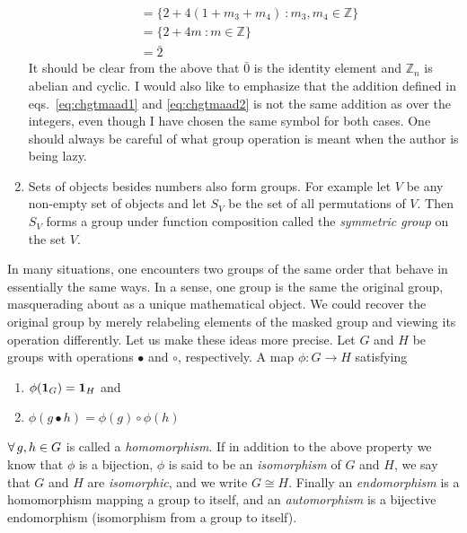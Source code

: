 \begin{example*}{}{}
\begin{enumerate}
\begin{equation}
\begin{aligned}
                         &=\{2+4(1+m_{3}+m_{4})\ : m_{3},m_{4}
                             \in \mathbb{Z}\}\\
                         &=\{2+4m\ : m\in \mathbb{Z}\}\\
                         &=\bar{2}
          \end{aligned}
        \end{equation}
        It should be clear from the above that $\bar{0}$ is the identity
        element and $\mathbb{Z}_n$ is abelian and cyclic. I would
        also like to emphasize that the addition defined in 
        eqs.~\eqref{eq:chgtmaad1} and \eqref{eq:chgtmaad2} is not the same
        addition as over the integers, even though I have chosen the same
        symbol for both cases. One should always be careful of what group
        operation is meant when the author is being lazy. 
  \item Sets of objects besides numbers also form groups. For example let $V$ 
        be any non-empty set of objects and let $S_{V}$ be the set of all
        permutations of $V$. Then $S_{V}$ forms a group under function
        composition called the {\it symmetric group} 
        on the set $V$.
\end{enumerate}
\end{example*}

In many situations, one encounters two groups of the same order that behave in
essentially the same ways. In a sense, one group is the same the original group,
masquerading about as a unique mathematical object. We could recover the
original group by merely relabeling elements of the masked group and viewing
its operation differently. Let us make these ideas more precise.
Let $G$ and $H$ be groups with operations $\bullet$ and
$\circ$, respectively. A map $\phi : G\to H$ satisfying
\begin{enumerate}
  \item $\phi({\mathbf 1}_G)={\mathbf 1}_H$ and
  \item $\phi(g \bullet h)=\phi(g)\circ\phi(h)$
\end{enumerate}
$\operatorname{\forall} g,h\in G$ is called a {\it homomorphism}. 
If in addition to the above property we know that $\phi$ is a bijection, 
$\phi$ is said to be an {\it isomorphism}  of $G$ and 
$H$, we say that $G$ and $H$ are {\it isomorphic}, and we write $G\cong H$. 
Finally an {\it endomorphism}  is a homomorphism 
mapping a group to itself, and an {\it automorphism} 
is a bijective endomorphism (isomorphism from a group to itself).

